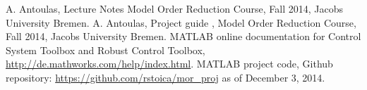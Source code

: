 \documentclass[10pt,a4paper]{article}
\begin{document}
\begin{thebibliography}{3}
 A. Antoulas, Lecture Notes Model Order Reduction Course, Fall 2014, Jacobs University Bremen.
 A. Antoulas, Project guide , Model Order Reduction Course, Fall 2014, Jacobs University Bremen.
 MATLAB online documentation for Control System Toolbox and Robust Control Toolbox, \url{http://de.mathworks.com/help/index.html}.
 MATLAB project code, Github repository: \url{https://github.com/rstoica/mor_proj} as of December 3, 2014.
\end{thebibliography}
\end{document}
